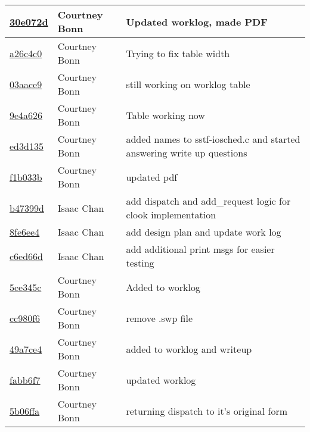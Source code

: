 \documentclass[letterpaper,10pt,draftclsnofoot,onecolumn,titlepage]{IEEEtran}
\begin{document}
\begin{tabular}{p{2cm} p{3cm} p{12cm}}
\href{https://github.com/courtbonn/CS-444/commit/30e072d1c632099297d1bb209b35dcd3bdb02a25}{30e072d} & Courtney Bonn & Updated worklog, made PDF\\\hline
\href{https://github.com/courtbonn/CS-444/commit/a26c4c0fa92b54d5e3198893ae7ef6e9b5fe139a}{a26c4c0} & Courtney Bonn & Trying to fix table width\\\hline
\href{https://github.com/courtbonn/CS-444/commit/03aace950555c852e351dff046443684678ff246}{03aace9} & Courtney Bonn & still working on worklog table\\\hline
\href{https://github.com/courtbonn/CS-444/commit/9e4a626bb9d41d55f124095a31341da5947303d9}{9e4a626} & Courtney Bonn & Table working now\\\hline
\href{https://github.com/courtbonn/CS-444/commit/ed3d13596e17bb82b25c641cbddec202cbe0e020}{ed3d135} & Courtney Bonn & added names to sstf-iosched.c and started answering write up questions\\\hline
\href{https://github.com/courtbonn/CS-444/commit/f1b033bfdcadb8aa0d9af64fd1d6963bdad423e3}{f1b033b} & Courtney Bonn & updated pdf\\\hline
\href{https://github.com/courtbonn/CS-444/commit/b47399d0a5fbc173d73f4f61c1fb1b70f72ca61a}{b47399d} & Isaac Chan & add dispatch and add\_request logic for clook implementation\\\hline
\href{https://github.com/courtbonn/CS-444/commit/8fe6ee4f10e247f5d23c7d082d700fbc7222bbc8}{8fe6ee4} & Isaac Chan & add design plan and update work log\\\hline
\href{https://github.com/courtbonn/CS-444/commit/c6ed66dde259cdf2e290ae5e6885c93ed571b4e7}{c6ed66d} & Isaac Chan & add additional print msgs for easier testing\\\hline
\href{https://github.com/courtbonn/CS-444/commit/5ce345ceb6730fcccacd41f08dc4b3f99c7bb053}{5ce345c} & Courtney Bonn & Added to worklog\\\hline
\href{https://github.com/courtbonn/CS-444/commit/cc980f65b008bd8d30c7d09f934ac11b45b6adab}{cc980f6} & Courtney Bonn & remove .swp file\\\hline
\href{https://github.com/courtbonn/CS-444/commit/49a7ce4718347c93bcb150d53fc5f71355bee0fe}{49a7ce4} & Courtney Bonn & added to worklog and writeup\\\hline
\href{https://github.com/courtbonn/CS-444/commit/fabb6f781a78d68466cc8c23156d25d426f5e2fd}{fabb6f7} & Courtney Bonn & updated worklog\\\hline
\href{https://github.com/courtbonn/CS-444/commit/5b06ffa743ac23d5ffb0b7a4985f121b9b56e6ca}{5b06ffa} & Courtney Bonn & returning dispatch to it's original form\\\hline

\end{tabular}
\end{document}
